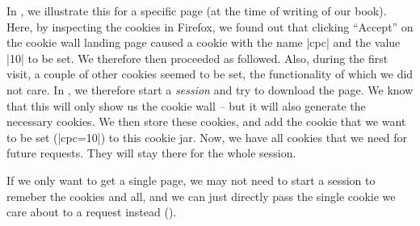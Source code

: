 In , we illustrate this for a specific page (at the
time of writing of our book). Here, by inspecting the cookies in Firefox,
we found out that clicking ``Accept'' on the cookie wall landing page
caused a cookie with the name |cpc| and the value |10| to be set. We
therefore then proceeded as followed. Also, during the first visit,
a couple of other cookies seemed to be set, the functionality of which
we did not care. In , we therefore start a \emph{session}
and try to download the page. We know that this will only show us the
cookie wall -- but it will also generate the necessary cookies. We then
store these cookies, and add the cookie that we want to be set (|cpc=10|)
to this cookie jar. Now, we have all cookies that we need for future
requests. They will stay there for the whole session.

If we only want to get a single page, we may not need to start a session
to remeber the cookies and all, and we can just directly pass the single
cookie we care about to a request instead ().









